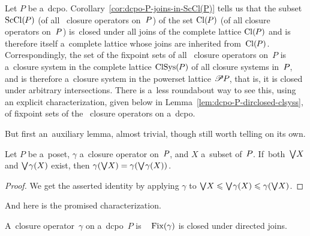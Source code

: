 \documentclass[11pt,letterpaper]{article}
\renewcommand{\thmskip}{\bigskip}
\renewcommand{\interskip}{\medskip}
\begin{document}
\thmskip

Let $P$ be a~dcpo.
Corollary~\ref{cor:dcpo-P-joins-in-ScCl(P)} tells us that
the subset $\mathop{\smash{\mathrm{ScCl}}}\nolimits(\mspace{-1mu} P)$ (of all \Scottcont\ closure operators on~$P\mspace{1mu}$)
	of the set $\mathop{\smash{\mathrm{Cl}}}\nolimits(\mspace{-1mu} P)$ (of all closure operators on~$P\mspace{1mu}$)
is~closed under all joins of the complete lattice $\mathop{\smash{\mathrm{Cl}}}\nolimits(\mspace{-1mu} P)$
and is therefore itself a~complete lattice whose joins are inherited from~$\mathop{\smash{\mathrm{Cl}}}\nolimits(\mspace{-1mu} P)$.
Correspondingly,
the set of the fixpoint sets of all \Scottcont\ closure operators on~$P$
is a~closure system in the complete lattice $\mathop{\smash{\mathrm{ClSys}}}\nolimits(\mspace{-1mu} P)$ of all closure systems in~$P\mspace{-1mu}$,
and is therefore a~closure system in the powerset lattice $\mathscr{P}\mspace{-1mu} P\mspace{-1mu}$,
that is, it is closed under arbitrary intersections.
There is a~less roundabout way to see this,
using an explicit characterization,
	given below in Lemma~\ref{lem:dcpo-P-dirclosed-clsyss},
of fixpoint sets of the \Scottcont\ closure operators on a~dcpo.

\pagebreak[3]
\txtskip

But first an~auxiliary lemma, almost trivial, though still worth telling on its own.

\thmskip

\begin{lemma}\label{lem:gamma(Join(X))=gamma(gamma(Join(X)))}
Let\/ $P$ be a~poset, $\gamma$ a~closure operator on\/~$P\mspace{-1mu}$, and\/ $X$ a~subset of\/~$P\mspace{-1mu}$.
If~both\/~$\mathop{\textstyle\bigvee}\nolimits\!X$ and\/ $\mathop{\textstyle\bigvee}\nolimits\mspace{-2mu}\gamma(X)$ exist,
then\/ $\gamma(\mathop{\textstyle\bigvee}\nolimits\!X) = \gamma(\mathop{\textstyle\bigvee}\nolimits\mspace{-2mu}\gamma(X))\mspace{1mu}$.
\end{lemma}

\interskip

\begin{proof}
We get the asserted identity by
applying $\gamma$ to $\mathop{\textstyle\bigvee}\nolimits\!X \leqslant \mathop{\textstyle\bigvee}\nolimits\mspace{-2mu}\gamma(X) \leqslant \gamma(\mathop{\textstyle\bigvee}\nolimits\!X)\mspace{1mu}$.
\end{proof}

\thmskip

And here is the promised characterization.

\thmskip

\begin{lemma}\label{lem:dcpo-P-dirclosed-clsyss}
A~closure operator\/~$\gamma$ on a~dcpo\/~$P$ is \Scottcont\
\iff\/ $\mathop{\smash{\mathrm{Fix}}}\nolimits(\gamma)$ is closed under directed joins.
\end{lemma}
\end{document}
